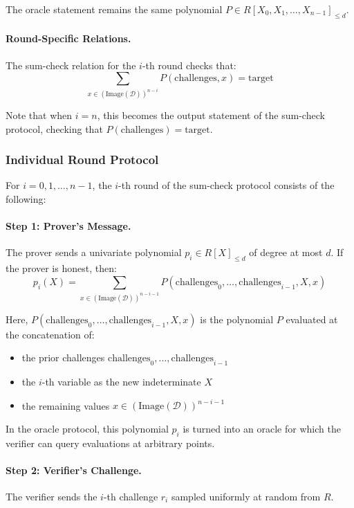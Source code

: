 The oracle statement remains the same polynomial $P \in R[X_0, X_1, \ldots, X_{n-1}]_{\leq d}$.

\paragraph{Round-Specific Relations.} The sum-check relation for the $i$-th round checks that:
\[
\sum_{x \in (\text{Image}(\mathcal{D}))^{n-i}} P(\text{challenges}, x) = \text{target}
\]

Note that when $i = n$, this becomes the output statement of the sum-check protocol, checking that $P(\text{challenges}) = \text{target}$.

\subsubsection{Individual Round Protocol}

For $i = 0, 1, \ldots, n-1$, the $i$-th round of the sum-check protocol consists of the following:

\paragraph{Step 1: Prover's Message.} The prover sends a univariate polynomial $p_i \in R[X]_{\leq d}$ of degree at most $d$. If the prover is honest, then:
\[
p_i(X) = \sum_{x \in (\text{Image}(\mathcal{D}))^{n-i-1}} P(\text{challenges}_0, \ldots, \text{challenges}_{i-1}, X, x)
\]

Here, $P(\text{challenges}_0, \ldots, \text{challenges}_{i-1}, X, x)$ is the polynomial $P$ evaluated at the concatenation of:
\begin{itemize}
    \item the prior challenges $\text{challenges}_0, \ldots, \text{challenges}_{i-1}$
    \item the $i$-th variable as the new indeterminate $X$
    \item the remaining values $x \in (\text{Image}(\mathcal{D}))^{n-i-1}$
\end{itemize}

In the oracle protocol, this polynomial $p_i$ is turned into an oracle for which the verifier can query evaluations at arbitrary points.

\paragraph{Step 2: Verifier's Challenge.} The verifier sends the $i$-th challenge $r_i$ sampled uniformly at random from $R$.

